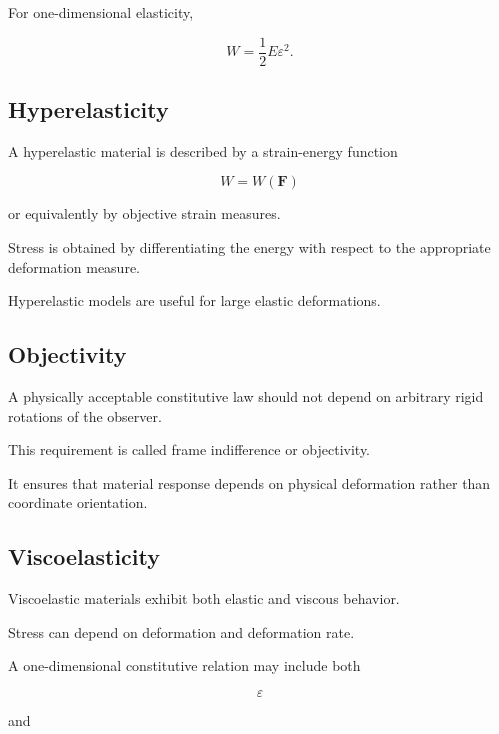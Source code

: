For one-dimensional elasticity,

\[
\boxed{
W
=
\frac12E\varepsilon^2.
}
\]

\subsection{Hyperelasticity}
\label{subsec:hyperelasticity}

A hyperelastic material is described by a strain-energy function

\[
\boxed{
W=W(\mathbf{F})
}
\]

or equivalently by objective strain measures.

Stress is obtained by differentiating the energy with respect to the
appropriate deformation measure.

Hyperelastic models are useful for large elastic deformations.

\subsection{Objectivity}
\label{subsec:continuum-objectivity}

A physically acceptable constitutive law should not depend on arbitrary
rigid rotations of the observer.

This requirement is called frame indifference or objectivity.

It ensures that material response depends on physical deformation rather
than coordinate orientation.

\subsection{Viscoelasticity}
\label{subsec:viscoelasticity}

Viscoelastic materials exhibit both elastic and viscous behavior.

Stress can depend on deformation and deformation rate.

A one-dimensional constitutive relation may include both

\[
\boxed{
\varepsilon
}
\]

and

